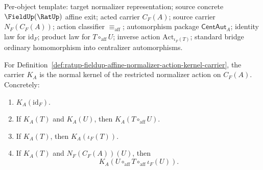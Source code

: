 Per-object template: target normalizer representation; source concrete
$\FieldUp(\RatUp)$ affine exit; acted carrier $C_F(A)$; source carrier
$N_F(C_F(A))$; action classifier $\equiv_{\mathrm{aff}}$; automorphism package
$\mathsf{CentAut}_A$; identity law for $\mathrm{id}_F$; product law for
$T\circ_{\mathrm{aff}}U$; inverse action $\mathrm{Act}_{\iota_F(T)}$; standard
bridge ordinary homomorphism into centralizer automorphisms.

\begin{theorem}
\label{thm:ratup-fieldup-affine-normalizer-action-kernel-normal}
For Definition~\ref{def:ratup-fieldup-affine-normalizer-action-kernel-carrier},
the carrier $K_A$ is the normal kernel of the restricted normalizer action on
$C_F(A)$. Concretely:
\begin{enumerate}
\item $K_A(\mathrm{id}_F)$.
\item If $K_A(T)$ and $K_A(U)$, then $K_A(T\circ_{\mathrm{aff}}U)$.
\item If $K_A(T)$, then $K_A(\iota_F(T))$.
\item If $K_A(T)$ and $N_F(C_F(A))(U)$, then
$$
K_A(U\circ_{\mathrm{aff}}T\circ_{\mathrm{aff}}\iota_F(U)).
$$
\end{enumerate}
\end{theorem}
